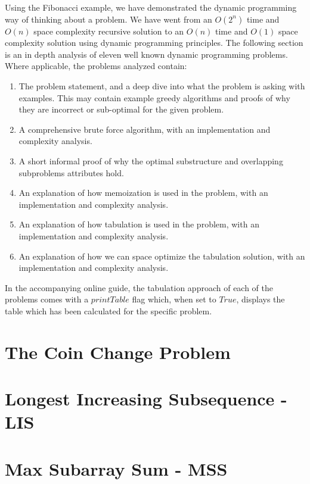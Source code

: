 Using the Fibonacci example, we have demonstrated the dynamic programming way of thinking about a problem.
We have went from an $O(2^n)$ time and $O(n)$ space complexity recursive solution to an $O(n)$ time and $O(1)$ space complexity solution using dynamic programming principles.
The following section is an in depth analysis of eleven well known dynamic programming problems.
Where applicable, the problems analyzed contain:

\begin{enumerate}
    \item The problem statement, and a deep dive into what the problem is asking with examples. This may contain example greedy algorithms and proofs of why they are incorrect or sub-optimal for the given problem.
    \item A comprehensive brute force algorithm, with an implementation and complexity analysis.
    \item A short informal proof of why the optimal substructure and overlapping subproblems attributes hold.
    \item An explanation of how memoization is used in the problem, with an implementation and complexity analysis.
    \item An explanation of how tabulation is used in the problem, with an implementation and complexity analysis.
    \item An explanation of how we can space optimize the tabulation solution, with an implementation and complexity analysis.

\end{enumerate}

In the accompanying online guide, the tabulation approach of each of the problems comes with a $printTable$ flag which, when set to $True$, displays the table which has been calculated for the specific problem.

\section{The Coin Change Problem}


\section{Longest Increasing Subsequence - LIS}


\section{Max Subarray Sum - MSS}


